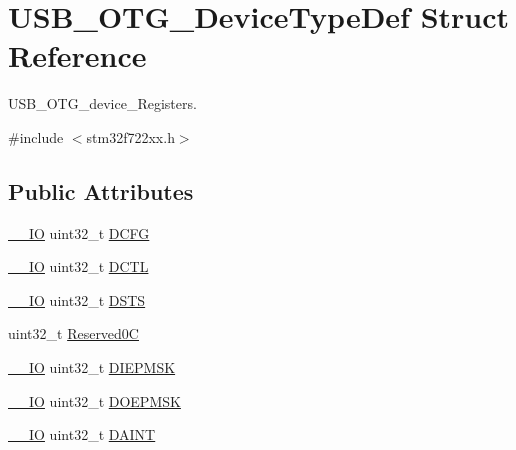 \hypertarget{struct_u_s_b___o_t_g___device_type_def}{}\section{U\+S\+B\+\_\+\+O\+T\+G\+\_\+\+Device\+Type\+Def Struct Reference}
\label{struct_u_s_b___o_t_g___device_type_def}


U\+S\+B\+\_\+\+O\+T\+G\+\_\+device\+\_\+\+Registers.  




{\ttfamily \#include $<$stm32f722xx.\+h$>$}

\subsection*{Public Attributes}
\begin{DoxyCompactItemize}
\item 
\mbox{\hyperlink{core__sc300_8h_aec43007d9998a0a0e01faede4133d6be}{\+\_\+\+\_\+\+IO}} uint32\+\_\+t \mbox{\hyperlink{struct_u_s_b___o_t_g___device_type_def_a9a9dac417f09f6a2d9a4b3110aa99b53}{D\+C\+FG}}
\item 
\mbox{\hyperlink{core__sc300_8h_aec43007d9998a0a0e01faede4133d6be}{\+\_\+\+\_\+\+IO}} uint32\+\_\+t \mbox{\hyperlink{struct_u_s_b___o_t_g___device_type_def_a091e9adaacbe0860ac18eb3792e2e3bb}{D\+C\+TL}}
\item 
\mbox{\hyperlink{core__sc300_8h_aec43007d9998a0a0e01faede4133d6be}{\+\_\+\+\_\+\+IO}} uint32\+\_\+t \mbox{\hyperlink{struct_u_s_b___o_t_g___device_type_def_a203b4c02e7f98d9be696b84f2f118263}{D\+S\+TS}}
\item 
uint32\+\_\+t \mbox{\hyperlink{struct_u_s_b___o_t_g___device_type_def_a954d7e94f74e00af915feadd074eb98e}{Reserved0C}}
\item 
\mbox{\hyperlink{core__sc300_8h_aec43007d9998a0a0e01faede4133d6be}{\+\_\+\+\_\+\+IO}} uint32\+\_\+t \mbox{\hyperlink{struct_u_s_b___o_t_g___device_type_def_a98f214f983aa10b4a7adbddcfe086bf6}{D\+I\+E\+P\+M\+SK}}
\item 
\mbox{\hyperlink{core__sc300_8h_aec43007d9998a0a0e01faede4133d6be}{\+\_\+\+\_\+\+IO}} uint32\+\_\+t \mbox{\hyperlink{struct_u_s_b___o_t_g___device_type_def_ae446389c3fb6d62537abe36a0d7e564f}{D\+O\+E\+P\+M\+SK}}
\item 
\mbox{\hyperlink{core__sc300_8h_aec43007d9998a0a0e01faede4133d6be}{\+\_\+\+\_\+\+IO}} uint32\+\_\+t \mbox{\hyperlink{struct_u_s_b___o_t_g___device_type_def_a5d28aaa3ea2e4e2246f9ba7025c6a8e7}{D\+A\+I\+NT}}
\item 

\end{DoxyCompactItemize}
